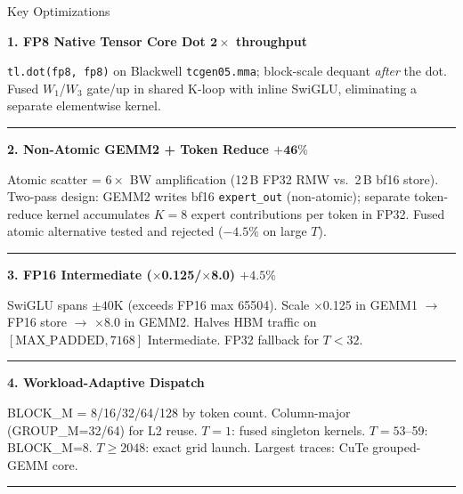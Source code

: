 \documentclass[final,t]{beamer}
\newlength{\colheight}
\begin{document}
\begin{frame}[t]
\begin{minipage}[t]{0.245\textwidth}
\begin{minipage}[t][\colheight][t]{\textwidth}
\begin{block}{Key Optimizations}

{\large\bfseries 1. FP8 Native Tensor Core Dot \hfill $\boldsymbol{2\times}$ throughput}
\vspace{2pt}

\texttt{tl.dot(fp8, fp8)} on Blackwell \texttt{tcgen05.mma}; block-scale dequant \emph{after} the dot. Fused $W_1$/$W_3$ gate/up in shared K-loop with inline SwiGLU, eliminating a separate elementwise kernel.

\vspace{4pt}\rule{\linewidth}{0.3pt}\vspace{4pt}

{\large\bfseries 2. Non-Atomic GEMM2 + Token Reduce \hfill $\boldsymbol{+46\%}$}
\vspace{2pt}

Atomic scatter = $6\times$ BW amplification (12\,B FP32 RMW vs.\ 2\,B bf16 store). Two-pass design: GEMM2 writes bf16 \texttt{expert\_out} (non-atomic); separate token-reduce kernel accumulates $K{=}8$ expert contributions per token in FP32. Fused atomic alternative tested and rejected ($-4.5\%$ on large $T$).

\vspace{4pt}\rule{\linewidth}{0.3pt}\vspace{4pt}

{\large\bfseries 3. FP16 Intermediate ($\times$0.125/$\times$8.0) \hfill $\boldsymbol{+4.5\%}$}
\vspace{2pt}

SwiGLU spans ${\pm}40$K (exceeds FP16 max 65504). Scale $\times$0.125 in GEMM1 $\to$ FP16 store $\to$ $\times$8.0 in GEMM2. Halves HBM traffic on $[\text{MAX\_PADDED}, 7168]$ Intermediate. FP32 fallback for $T{<}32$.

\vspace{4pt}\rule{\linewidth}{0.3pt}\vspace{4pt}

{\large\bfseries 4. Workload-Adaptive Dispatch}
\vspace{2pt}

BLOCK\_M = 8/16/32/64/128 by token count. Column-major (GROUP\_M=32/64) for L2 reuse. $T{=}1$: fused singleton kernels. $T{=}53$--59: BLOCK\_M=8. $T{\ge}2048$: exact grid launch. Largest traces: CuTe grouped-GEMM core.

\vspace{4pt}\rule{\linewidth}{0.3pt}\vspace{4pt}


\end{block}
\end{minipage}
\end{minipage}
\end{frame}
\end{document}
